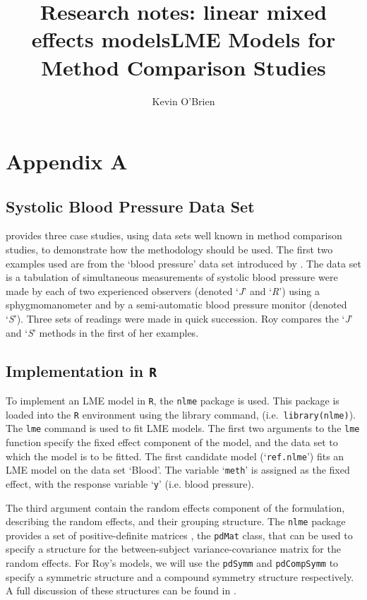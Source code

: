 \documentclass[12pt, a4paper]{report}
\title{Research notes: linear mixed effects models}
\author{ } \date{ }
\theoremstyle{plain}
\theoremstyle{definition}
\theoremstyle{remark}
\begin{document}
\author{Kevin O'Brien}
\title{LME Models for Method Comparison Studies}

\chapter{Appendix A}


\section{Systolic Blood Pressure Data Set}

\citet{ARoy2009} provides three case studies, using data sets well known in method comparison studies, to demonstrate how the methodology should be used. The first two examples used are from the `blood pressure' data set introduced by \citet{BA99}. The data set is a tabulation of simultaneous measurements of systolic blood pressure were made by each of two experienced observers (denoted `\textit{J}' and `\textit{R}') using a sphygmomanometer and by a semi-automatic blood pressure monitor (denoted `\textit{S}'). Three sets of readings were made in quick succession. Roy compares the `\textit{J}' and `\textit{S}' methods in the first of her examples.

\section{Implementation in \texttt{R}}
To implement an LME model in \texttt{R}, the \texttt{nlme} package is used. This package is loaded into the \texttt{R} environment using the library command, (i.e.\ \texttt{library(nlme)}). The \texttt{lme} command is used to fit LME models. The first two arguments to the \texttt{lme} function specify the fixed effect component of the model, and the data set to which the model is to be fitted. The first candidate model (`\texttt{ref.nlme}') fits an LME model on the data set `Blood'. The variable `\texttt{meth}' is assigned as the fixed effect, with the response variable `\texttt{y}' (i.e. blood pressure).

The third argument contain the random effects component of the formulation, describing the random effects, and their grouping structure. The \texttt{nlme} package provides a set of positive-definite matrices , the \texttt{pdMat} class, that can be used to specify a structure for the between-subject variance-covariance matrix for the random effects. For Roy's models, we will use the \texttt{pdSymm} and \texttt{pdCompSymm} to specify a symmetric structure and a compound symmetry structure respectively. A full discussion of these structures can be found in \citet[pg. 158]{PB}.
\end{document}
